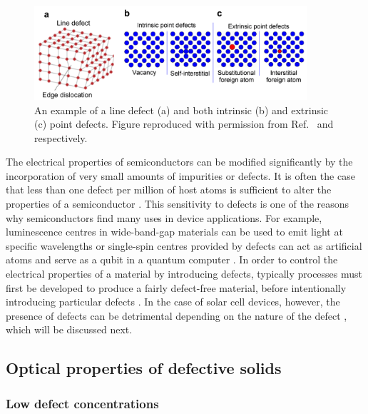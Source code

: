 \documentclass[11pt, twoside]{report}
\begin{document}
\begin{figure}[h!]
  \centering
    \includegraphics[width=0.9\textwidth]{figures/defects.png}
    \caption[An example of a line defect (a) and both intrinsic (b) and extrinsic (c) point defects.]{An example of a line defect (a) and both intrinsic (b) and extrinsic (c) point defects. Figure reproduced with permission from Ref.~ and  respectively.}
  \label{defects}
\end{figure}

The electrical properties of semiconductors can be modified significantly by the incorporation of very small amounts of impurities or defects. It is often the case that less than one defect per million of host atoms is sufficient to alter the properties of a semiconductor \cite{fund_semi}. This sensitivity to defects is one of the reasons why semiconductors find many uses in device applications. For example, luminescence centres in wide-band-gap materials can be used to emit light at specific wavelengths or single-spin centres provided by defects can act as artificial atoms and serve as a qubit in a quantum computer \cite{defects_tutorial}. In order to control the electrical properties of a material by introducing defects, typically processes must first be developed to produce a fairly defect-free material, before intentionally introducing particular defects \cite{fund_semi}. In the case of solar cell devices, however, the presence of defects can be detrimental depending on the nature of the defect \cite{Aron_defect_tolerance}, which will be discussed next. 

\subsection{Optical properties of defective solids}\label{defect_theory}
\subsubsection{Low defect concentrations}
\end{document}
